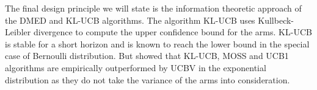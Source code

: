	The final design principle we will state is the information theoretic approach of the DMED \cite{honda2010asymptotically} and KL-UCB \cite{garivier2011kl} algorithms. The algorithm KL-UCB uses Kullbeck-Leibler divergence to compute the upper confidence bound for the arms. KL-UCB is stable for a short horizon and is known to reach the \cite{lai1985asymptotically} lower bound in the special case of Bernoulli distribution. But \cite{garivier2011kl} showed that KL-UCB, MOSS and UCB1 algorithms are  empirically outperformed by UCBV in the exponential distribution as they do not take the variance of the arms into consideration. 